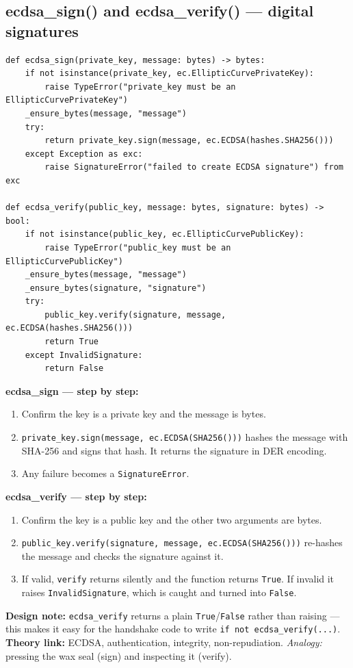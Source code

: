 \documentclass[11pt,a4paper]{report}
\begin{document}
\subsection{ecdsa\_sign() and ecdsa\_verify() --- digital signatures}
\begin{lstlisting}[style=py,caption={crypto.py --- ECDSA signing and verification.}]
def ecdsa_sign(private_key, message: bytes) -> bytes:
    if not isinstance(private_key, ec.EllipticCurvePrivateKey):
        raise TypeError("private_key must be an EllipticCurvePrivateKey")
    _ensure_bytes(message, "message")
    try:
        return private_key.sign(message, ec.ECDSA(hashes.SHA256()))
    except Exception as exc:
        raise SignatureError("failed to create ECDSA signature") from exc

def ecdsa_verify(public_key, message: bytes, signature: bytes) -> bool:
    if not isinstance(public_key, ec.EllipticCurvePublicKey):
        raise TypeError("public_key must be an EllipticCurvePublicKey")
    _ensure_bytes(message, "message")
    _ensure_bytes(signature, "signature")
    try:
        public_key.verify(signature, message, ec.ECDSA(hashes.SHA256()))
        return True
    except InvalidSignature:
        return False
\end{lstlisting}
\textbf{ecdsa\_sign --- step by step:}
\begin{enumerate}
  \item Confirm the key is a private key and the message is bytes.
  \item \texttt{private\_key.sign(message, ec.ECDSA(SHA256()))} hashes the
        message with SHA-256 and signs that hash. It returns the signature in
        DER encoding.
  \item Any failure becomes a \texttt{SignatureError}.
\end{enumerate}
\textbf{ecdsa\_verify --- step by step:}
\begin{enumerate}
  \item Confirm the key is a public key and the other two arguments are bytes.
  \item \texttt{public\_key.verify(signature, message, ec.ECDSA(SHA256()))}
        re-hashes the message and checks the signature against it.
  \item If valid, \texttt{verify} returns silently and the function returns
        \texttt{True}. If invalid it raises \texttt{InvalidSignature}, which is
        caught and turned into \texttt{False}.
\end{enumerate}
\textbf{Design note:} \texttt{ecdsa\_verify} returns a plain
\texttt{True}/\texttt{False} rather than raising --- this makes it easy for the
handshake code to write \texttt{if not ecdsa\_verify(...)}. \textbf{Theory link:}
ECDSA, authentication, integrity, non-repudiation. \emph{Analogy:} pressing the
wax seal (sign) and inspecting it (verify).
\end{document}
